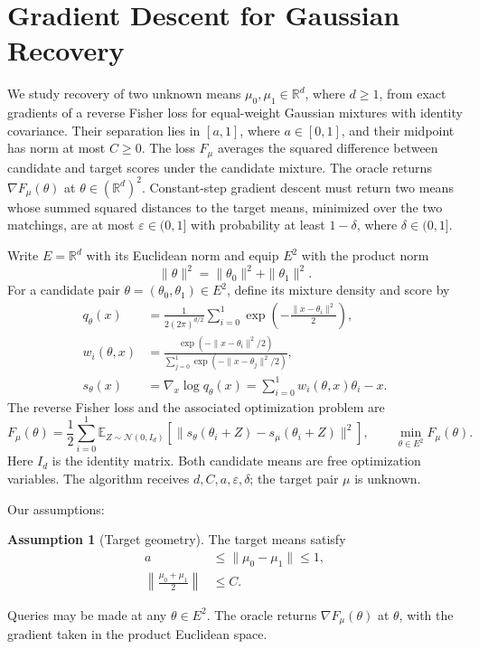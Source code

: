 \documentclass[10pt]{article}
\theoremstyle{definition}
\newtheorem{assumption}{Assumption}
\begin{document}
\section*{Gradient Descent for Gaussian Recovery}
We study recovery of two unknown means $\mu_0,\mu_1\in\mathbb{R}^d$, where $d\geq1$, from exact gradients of a reverse Fisher loss for equal-weight Gaussian mixtures with identity covariance. Their separation lies in $[a,1]$, where $a\in[0,1]$, and their midpoint has norm at most $C\geq0$. The loss $F_\mu$ averages the squared difference between candidate and target scores under the candidate mixture. The oracle returns $\nabla F_\mu(\theta)$ at $\theta\in(\mathbb{R}^d)^2$. Constant-step gradient descent must return two means whose summed squared distances to the target means, minimized over the two matchings, are at most $\varepsilon\in(0,1]$ with probability at least $1-\delta$, where $\delta\in(0,1]$.

Write $E=\mathbb{R}^d$ with its Euclidean norm and equip $E^2$ with the product norm
\[
\|\theta\|^2=\|\theta_0\|^2+\|\theta_1\|^2.
\]
For a candidate pair $\theta=(\theta_0,\theta_1)\in E^2$, define its mixture density and score by
\[
\begin{aligned}
q_\theta(x)
&=\frac{1}{2(2\pi)^{d/2}}\sum_{i=0}^1
\exp\!\left(-\frac{\|x-\theta_i\|^2}{2}\right),\\
w_i(\theta,x)
&=\frac{\exp(-\|x-\theta_i\|^2/2)}
{\sum_{j=0}^1\exp(-\|x-\theta_j\|^2/2)},\\
s_\theta(x)
&=\nabla_x\log q_\theta(x)
=\sum_{i=0}^1 w_i(\theta,x)\theta_i-x.
\end{aligned}
\]
The reverse Fisher loss and the associated optimization problem are
\[
F_\mu(\theta)
=\frac12\sum_{i=0}^1
\mathbb{E}_{Z\sim\mathcal{N}(0,I_d)}
\left[\|s_\theta(\theta_i+Z)-s_\mu(\theta_i+Z)\|^2\right],
\qquad
\min_{\theta\in E^2}F_\mu(\theta).
\]
Here $I_d$ is the identity matrix. Both candidate means are free optimization variables. The algorithm receives $d,C,a,\varepsilon,\delta$; the target pair $\mu$ is unknown.

Our assumptions:
\begin{assumption}[Target geometry]
The target means satisfy
\[
\begin{aligned}
a&\leq\|\mu_0-\mu_1\|\leq1,\\
\left\|\frac{\mu_0+\mu_1}{2}\right\|&\leq C.
\end{aligned}
\]
\end{assumption}

Queries may be made at any $\theta\in E^2$. The oracle returns $\nabla F_\mu(\theta)$ at $\theta$, with the gradient taken in the product Euclidean space.
\end{document}
